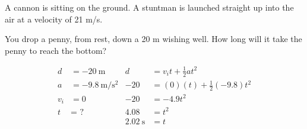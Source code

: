 \documentclass[10pt]{exam}
\begin{document}
\begin{questions}
  \pagebreak
  \printeqs

  \question 
    A cannon is sitting on the ground.  A stuntman is launched straight up into the air at a velocity of 21 m/s.


  \question
    You drop a penny, from rest, down a 20 m wishing well.  How long will it take the penny to reach the bottom?

    \begin{solution}[\stretch{1}]
      \begin{align*}
        d   &= -\SI{20}{\meter}   & 
                              d &= v_i t+\frac{1}{2}at^2 \\
        a   &= -\SI{9.8}{\meter\per\second^2} &
                   -20 &= (0)(t) + \frac{1}{2}(-9.8)t^2 \\
        v_i &= 0     &
                                        -20 &= -4.9t^2 \\
        t &= \text{ ?} & 
                                        4.08 &= t^2 \\
        &&                \SI{2.02}{\second} &= t
      \end{align*}
    \end{solution}


\end{questions}
\end{document}
